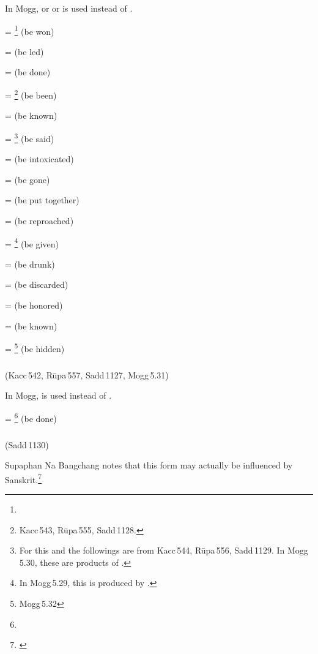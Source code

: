 In Mogg,  or  or  is used instead of .

 = \footnote{} (be won)\par
{} =  (be led)\par
{} =  (be done)\par
{} = \footnote{Kacc\,543, R\=upa\,555, Sadd\,1128. } (be been)\par
{} =  (be known)\par
{} = \footnote{For this and the followings are from Kacc\,544, R\=upa\,556, Sadd\,1129. In Mogg\,5.30, these are products of .} (be said)\par
{} =  (be intoxicated)\par
{} =  (be gone)\par
{} =  (be put together)\par
{} =  (be reproached)\par
{} = \footnote{In Mogg\,5.29, this is produced by .} (be given)\par
{} =  (be drunk)\par
{} =  (be discarded)\par
{} =  (be honored)\par
{} =  (be known)\par
{} = \footnote{Mogg\,5.32} (be hidden)\par

\subparagraph*{} (Kacc\,542, R\=upa\,557, Sadd\,1127, Mogg\,5.31)\label{pacck3:ricca}\label{pacck3:ya2}

In Mogg,  is used instead of .

 = \footnote{} (be done)\par

\subparagraph*{} (Sadd\,1130)\label{pacck3:tapya}

Supaphan Na Bangchang notes that this form may actually be  influenced by Sanskrit.\footnote{\citealp[p.~601]{supaphan:pali}}

